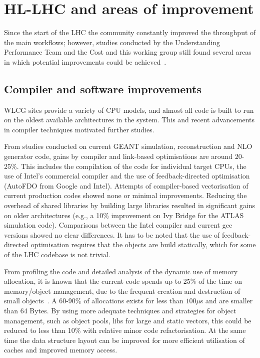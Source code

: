 \section{HL-LHC and areas of improvement}
Since the start of the LHC the community constantly improved the
throughput of the main workflows; however, studies conducted by the
Understanding Performance Team and the Cost and this working group
still found several areas in which potential improvements could be
achieved~\cite{improvements}.

\subsection{Compiler and software improvements}
WLCG sites provide a variety of CPU models, and almost all code is
built to run on the oldest available architectures in the system. This
and recent advancements in compiler techniques motivated further
studies.

From studies conducted on current GEANT simulation, reconstruction and
NLO generator code, gains by compiler and link-based optimisations are
around 20-25\%. This includes the compilation of the code for
individual target CPUs, the use of Intel’s commercial compiler and the
use of feedback-directed optimisation (AutoFDO from Google and
Intel). Attempts of compiler-based vectorisation of current production
codes showed none or minimal improvements. Reducing the overhead of
shared libraries by building large libraries resulted in significant
gains on older architectures (e.g., a 10\% improvement on Ivy Bridge
for the ATLAS simulation code).  Comparisons between the Intel
compiler and current gcc versions showed no clear differences. It has
to be noted that the use of feedback-directed optimisation requires
that the objects are build statically, which for some of the LHC
codebase is not trivial.

From profiling the code and detailed analysis of the dynamic use of
memory allocation, it is known that the current code spends up to 25\%
of the time on memory/object management, due to the frequent creation
and destruction of small objects~\cite{fomtools}. A 60-90\% of
allocations exists for less than $100\mu$s and are smaller than 64
Bytes.  By using more adequate techniques and strategies for object
management, such as object pools, libs for large and static vectors,
this could be reduced to less than 10\% with relative minor code
refactorisation. At the same time the data structure layout can be
improved for more efficient utilisation of caches and improved memory
access.

